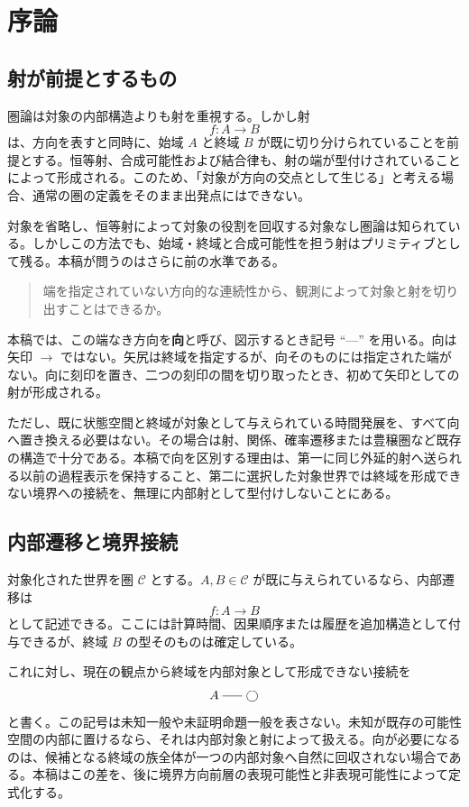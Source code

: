 \documentclass[a4paper,11pt]{ltjsarticle}
\theoremstyle{definition}
\theoremstyle{plain}
\newcommand{\dfix}{\bigcirc}
\newcommand{\dline}{\mathrel{\rule[0.55ex]{1.6em}{0.4pt}}}
\begin{document}
\tableofcontents

\section{序論}

\subsection{射が前提とするもの}

圏論は対象の内部構造よりも射を重視する。しかし射
\[
 f:A\longrightarrow B
\]
は、方向を表すと同時に、始域 $A$ と終域 $B$ が既に切り分けられていることを前提とする。恒等射、合成可能性および結合律も、射の端が型付けされていることによって形成される。このため、「対象が方向の交点として生じる」と考える場合、通常の圏の定義をそのまま出発点にはできない。

対象を省略し、恒等射によって対象の役割を回収する対象なし圏論は知られている\cite{HellerKról2016}。しかしこの方法でも、始域・終域と合成可能性を担う射はプリミティブとして残る。本稿が問うのはさらに前の水準である。
\begin{quote}
端を指定されていない方向的な連続性から、観測によって対象と射を切り出すことはできるか。
\end{quote}

本稿では、この端なき方向を\textbf{向}と呼び、図示するとき記号 ``---'' を用いる。向は矢印 $\to$ ではない。矢尻は終域を指定するが、向そのものには指定された端がない。向に刻印を置き、二つの刻印の間を切り取ったとき、初めて矢印としての射が形成される。

ただし、既に状態空間と終域が対象として与えられている時間発展を、すべて向へ置き換える必要はない。その場合は射、関係、確率遷移または豊穣圏など既存の構造で十分である。本稿で向を区別する理由は、第一に同じ外延的射へ送られる以前の過程表示を保持すること、第二に選択した対象世界では終域を形成できない境界への接続を、無理に内部射として型付けしないことにある。

\subsection{内部遷移と境界接続}

対象化された世界を圏 $\mathcal C$ とする。$A,B\in\mathcal C$ が既に与えられているなら、内部遷移は
\[
 f:A\longrightarrow B
\]
として記述できる。ここには計算時間、因果順序または履歴を追加構造として付与できるが、終域 $B$ の型そのものは確定している。

これに対し、現在の観点から終域を内部対象として形成できない接続を
\[
 A\dline\dfix
\]
と書く。この記号は未知一般や未証明命題一般を表さない。未知が既存の可能性空間の内部に置けるなら、それは内部対象と射によって扱える。向が必要になるのは、候補となる終域の族全体が一つの内部対象へ自然に回収されない場合である。本稿はこの差を、後に境界方向前層の表現可能性と非表現可能性によって定式化する。
\end{document}
